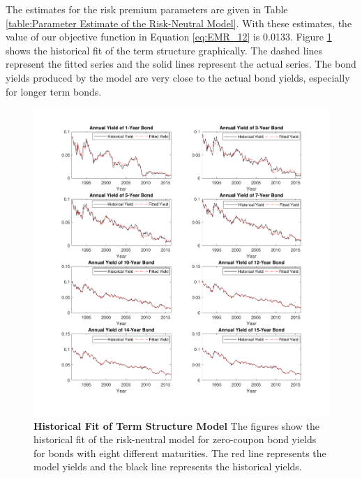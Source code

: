 \documentclass{sfuthesis}
\numberwithin{equation}{chapter}
\begin{document}
	
		\justify
		The estimates for the risk premium parameters are given in Table \ref{table:Parameter Estimate of the Risk-Neutral Model}. With these estimates, the value of our objective function in Equation \eqref{eq:EMR_12} is 0.0133. Figure \ref{fig:Historical fit of term structure model} shows the historical fit of the term structure graphically. The dashed lines represent the fitted series and the solid lines represent the actual series. The bond yields produced by the model are very close to the actual bond yields, especially for longer term bonds.  
		\begin{figure}[h]
			\includegraphics[width=1.1\linewidth]{ResultPlot/rnfit.pdf} 
			\caption[Historical Fit of Term Structure Model]{\textbf{Historical Fit of Term Structure Model}
				\vspace{-0.4cm}
				\newline\footnotesize \justify The figures show the historical fit of the risk-neutral model for zero-coupon bond yields for bonds with eight different maturities. The red line represents the model yields and the black line represents the historical yields.}
			\label{fig:Historical fit of term structure model}
		\end{figure}
	
\end{document}
